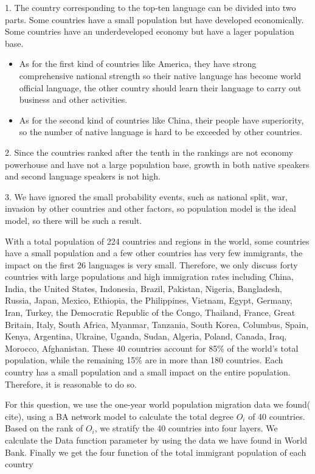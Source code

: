   1. The country corresponding to the top-ten language can be divided into two parts. Some countries have a small population but have developed economically. Some countries have an underdeveloped  economy but have a lager population base.
      \begin{itemize}
        \item As for the first kind of countries like America, they have strong comprehensive national strength so their native language has become world official language, the other country should learn their language to carry out business and other activities.
        \item As for the second kind of countries like China, their people have superiority, so the number of native language is hard to be exceeded by other countries.
      \end{itemize}

  2. Since the countries ranked after the tenth in the rankings are not economy powerhouse and have not a large population base, growth in both native speakers and second language speakers is not high.

      3. We have ignored the small probability events, such as national split, war, invasion by other countries and other factors, so population model is the ideal model, so there will be such a result.


With a total population of 224 countries and regions in the world, some countries have a small population and a few other countries has very few immigrants, the impact on the first 26 languages is very small. Therefore, we only discuss forty countries with large populations and high immigration rates including China, India, the United States, Indonesia, Brazil, Pakistan, Nigeria, Bangladesh, Russia, Japan, Mexico, Ethiopia, the Philippines, Vietnam, Egypt, Germany, Iran, Turkey, the Democratic Republic of the Congo, Thailand, France, Great Britain, Italy, South Africa, Myanmar, Tanzania, South Korea, Columbus, Spain, Kenya, Argentina, Ukraine, Uganda, Sudan, Algeria, Poland, Canada, Iraq, Morocco, Afghanistan. These 40 countries account for 85\% of the world's total population, while the remaining 15\% are in more than 180 countries. Each country has a small population and a small impact on the entire population. Therefore, it is reasonable to do so.

For this question, we use the one-year world population migration data we found( cite), using a BA network model to calculate the total degree ${{O}_{i}}$ of 40 countries. Based on the rank of ${{O}_{i}}$, we stratify the 40 countries into four layers. We calculate the Data function parameter by using the data we have found in World Bank. Finally we get the four function of the total immigrant population of each country
 
